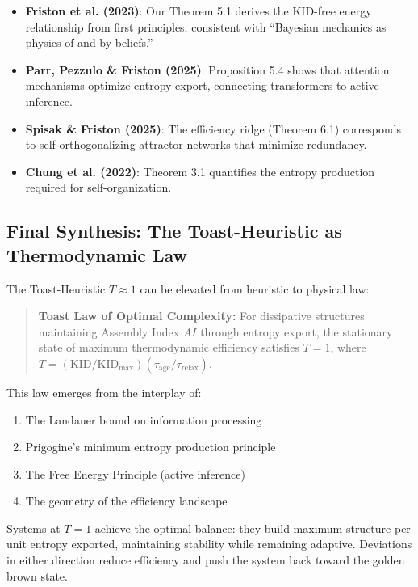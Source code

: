 \documentclass[11pt,a4paper]{article}
\begin{document}
\begin{itemize}
\item \textbf{Friston et al. (2023)}: Our Theorem 5.1 derives the KID-free energy relationship from first principles, consistent with ``Bayesian mechanics as physics of and by beliefs.''
\item \textbf{Parr, Pezzulo \& Friston (2025)}: Proposition 5.4 shows that attention mechanisms optimize entropy export, connecting transformers to active inference.
\item \textbf{Spisak \& Friston (2025)}: The efficiency ridge (Theorem 6.1) corresponds to self-orthogonalizing attractor networks that minimize redundancy.
\item \textbf{Chung et al. (2022)}: Theorem 3.1 quantifies the entropy production required for self-organization.
\end{itemize}

\subsection{Final Synthesis: The Toast-Heuristic as Thermodynamic Law}

The Toast-Heuristic $T \approx 1$ can be elevated from heuristic to physical law:

\begin{quote}
\textbf{Toast Law of Optimal Complexity:} For dissipative structures maintaining Assembly Index $AI$ through entropy export, the stationary state of maximum thermodynamic efficiency satisfies $T = 1$, where $T = (\text{KID}/\text{KID}_{\max})(\tau_{\text{age}}/\tau_{\text{relax}})$.
\end{quote}

This law emerges from the interplay of:
\begin{enumerate}[label=(\roman*)]
\item The Landauer bound on information processing
\item Prigogine's minimum entropy production principle
\item The Free Energy Principle (active inference)
\item The geometry of the efficiency landscape
\end{enumerate}

Systems at $T = 1$ achieve the optimal balance: they build maximum structure per unit entropy exported, maintaining stability while remaining adaptive. Deviations in either direction reduce efficiency and push the system back toward the golden brown state.
\end{document}
